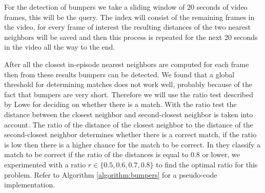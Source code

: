 \documentclass{report}
\begin{document}
For the detection of bumpers we take a sliding window of 20 seconds of video frames, this will be the query. The index will consist of the remaining frames in the video, for every frame of interest the resulting distances of the two nearest neighbors will be saved and then this process is repeated for the next 20 seconds in the video all the way to the end.

After all the closest in-episode nearest neighbors are computed for each frame then from these results bumpers can be detected. We found that a global threshold for determining matches does not work well, probably because of the fact that bumpers are very short. Therefore we will use the ratio test described by Lowe \cite{lowe2004distinctive} for deciding on whether there is a match. With the ratio test the distance between the closest neighbor and second-closest neighbor is taken into account. The ratio of the distance of the closest neighbor to the distance of the second-closest neighbor determines whether there is a correct match, if the ratio is low then there is a higher chance for the match to be correct. In \cite{lowe2004distinctive} they classify a match to be correct if the ratio of the distances is equal to 0.8 or lower, we experimented with a ratio $r \in \{0.5, 0.6, 0.7, 0.8\}$ to find the optimal ratio for this problem. Refer to Algorithm \ref{algorithm:bumpers} for a pseudo-code implementation.
\end{document}
